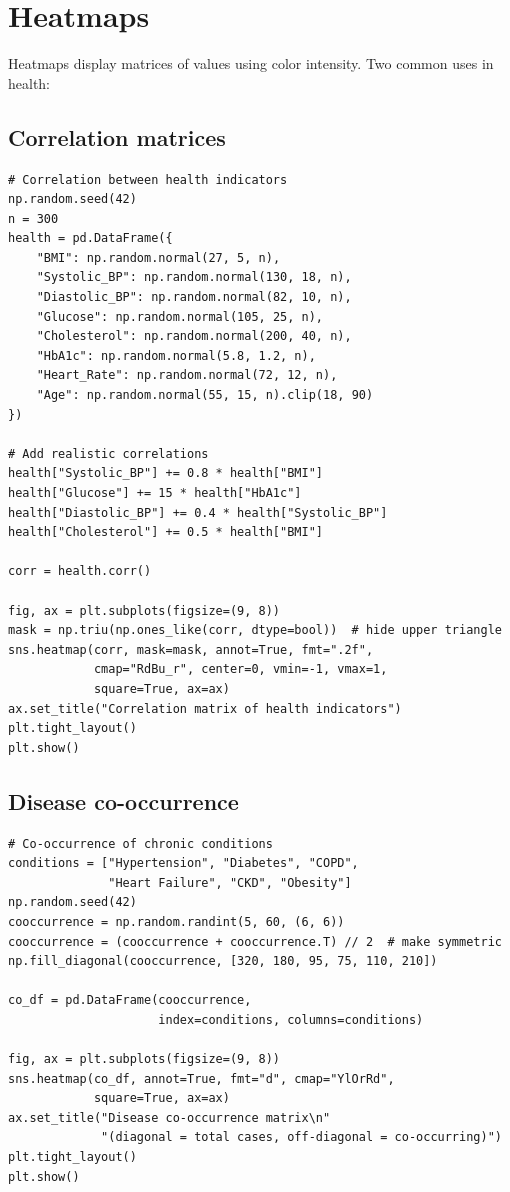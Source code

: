 \section{Heatmaps}

Heatmaps display matrices of values using color intensity. Two common uses in health:

\subsection{Correlation matrices}

\begin{verbatim}
# Correlation between health indicators
np.random.seed(42)
n = 300
health = pd.DataFrame({
    "BMI": np.random.normal(27, 5, n),
    "Systolic_BP": np.random.normal(130, 18, n),
    "Diastolic_BP": np.random.normal(82, 10, n),
    "Glucose": np.random.normal(105, 25, n),
    "Cholesterol": np.random.normal(200, 40, n),
    "HbA1c": np.random.normal(5.8, 1.2, n),
    "Heart_Rate": np.random.normal(72, 12, n),
    "Age": np.random.normal(55, 15, n).clip(18, 90)
})

# Add realistic correlations
health["Systolic_BP"] += 0.8 * health["BMI"]
health["Glucose"] += 15 * health["HbA1c"]
health["Diastolic_BP"] += 0.4 * health["Systolic_BP"]
health["Cholesterol"] += 0.5 * health["BMI"]

corr = health.corr()

fig, ax = plt.subplots(figsize=(9, 8))
mask = np.triu(np.ones_like(corr, dtype=bool))  # hide upper triangle
sns.heatmap(corr, mask=mask, annot=True, fmt=".2f",
            cmap="RdBu_r", center=0, vmin=-1, vmax=1,
            square=True, ax=ax)
ax.set_title("Correlation matrix of health indicators")
plt.tight_layout()
plt.show()
\end{verbatim}

\subsection{Disease co-occurrence}

\begin{verbatim}
# Co-occurrence of chronic conditions
conditions = ["Hypertension", "Diabetes", "COPD",
              "Heart Failure", "CKD", "Obesity"]
np.random.seed(42)
cooccurrence = np.random.randint(5, 60, (6, 6))
cooccurrence = (cooccurrence + cooccurrence.T) // 2  # make symmetric
np.fill_diagonal(cooccurrence, [320, 180, 95, 75, 110, 210])

co_df = pd.DataFrame(cooccurrence,
                     index=conditions, columns=conditions)

fig, ax = plt.subplots(figsize=(9, 8))
sns.heatmap(co_df, annot=True, fmt="d", cmap="YlOrRd",
            square=True, ax=ax)
ax.set_title("Disease co-occurrence matrix\n"
             "(diagonal = total cases, off-diagonal = co-occurring)")
plt.tight_layout()
plt.show()
\end{verbatim}

